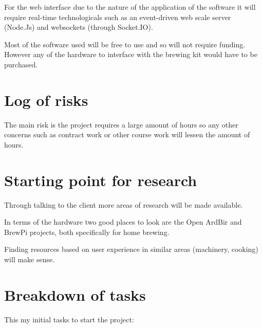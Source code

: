 For the web interface due to the nature of the application of the software it will require real-time technologicals such as an event-driven web scale server (Node.Js) and websockets (through Socket.IO).

Most of the software used will be free to use and so will not require funding. However any of the hardware to interface with the brewing kit would have to be purchased.

\section{Log of risks}

The main risk is the project requires a large amount of hours so any other concerns such as contract work or other course work will lessen the amount of hours.


\section{Starting point for research}

Through talking to the client more areas of research will be made available.

In terms of the hardware two good places to look are the Open ArdBir and BrewPi projects, both specifically for home brewing.

Finding resources based on user experience in similar areas (machinery, cooking) will make sense.

\section{Breakdown of tasks}

This my initial tasks to start the project:

